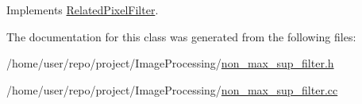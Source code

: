 Implements \hyperlink{classRelatedPixelFilter_a4701695c3b2ca7fdcc41b3d03c5840df}{Related\+Pixel\+Filter}.



The documentation for this class was generated from the following files\+:\begin{DoxyCompactItemize}
\item 
/home/user/repo/project/\+Image\+Processing/\hyperlink{non__max__sup__filter_8h}{non\+\_\+max\+\_\+sup\+\_\+filter.\+h}\item 
/home/user/repo/project/\+Image\+Processing/\hyperlink{non__max__sup__filter_8cc}{non\+\_\+max\+\_\+sup\+\_\+filter.\+cc}\end{DoxyCompactItemize}
